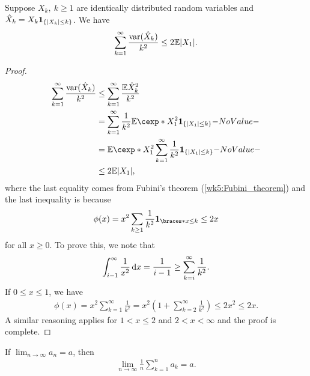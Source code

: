 \documentclass[12pt]{article}
\begin{document}
\begin{Lemma} \label{wk7:lemma:var_mean_ineq}
Suppose $X_k,\ k \geq 1$ are identically distributed random variables and $\hat{X}_k = X_k {\bf 1}_{\{|X_k| \leq k\}}$. We have
\begin{align*}
\sum_{k=1}^{\infty} \frac{\var(\hat{X}_k)}{k^2} \leq 2 \E |X_1|.
\end{align*}
\end{Lemma}
%
\begin{proof}
\begin{align*}
\sum_{k=1}^{\infty} \frac{\var(\hat{X}_k)}{k^2} 
&\leq \sum_{k=1}^{\infty} \frac{\E \hat{X}_k^2}{k^2} \\
&= \sum_{k=1}^{\infty} \frac{1}{k^2} \E[X_1^2 \indicatore{\{|X_1| \leq k\}}] \\
&= \E[X_1^2 \sum_{k=1}^{\infty} \frac{1}{k^2} \indicatore{\{|X_1| \leq k\}}] \\
&\leq 2 \E |X_1|,
\end{align*}
where the last equality comes from Fubini's theorem (\cref{wk5:Fubini_theorem}) and the last inequality is because 
\begin{align*}
\phi(x) = x^2\sum_{k\geq1} \ofrac{k^2} \indicator{x\leq k} \leq 2x
\end{align*}
for all $x\geq0$. To prove this, we note that
\begin{align*}
\int_{i-1}^{\infty} \frac{1}{x^2} \,\mathrm{d} x = \frac{1}{i-1} \geq \sum_{k = i}^{\infty} \frac{1}{k^2}.
\end{align*}
If $0 \leq x \leq 1$, we have
\begin{align*}
\phi(x) = x^2 \sum_{k = 1}^{\infty} \frac{1}{k^2} 
= x^2 \left(1 + \sum_{k = 2}^{\infty} \frac{1}{k^2} \right)
\leq 2 x^2 \leq 2x.
\end{align*}
A similar reasoning applies for $1 < x \leq 2$ and $2 < x < \infty$ and the proof is complete.
\end{proof}
%
\begin{Lemma} \label{wk7:lemma:Cesaro}
If $\lim_{n \to \infty} a_n = a$, then 
\begin{align*}
\lim_{n \to \infty} \frac{1}{n} \sum_{k = 1}^{n} a_k = a.
\end{align*}
\end{Lemma}
\end{document}
